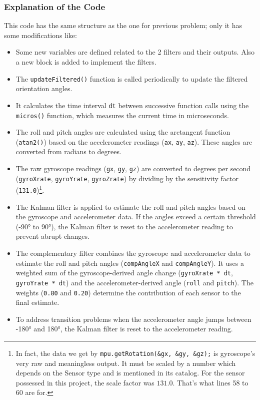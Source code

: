 \documentclass[conference]{IEEEtran}
\let\oldtexttt\texttt
\renewcommand{\texttt}[1]{\small\oldtexttt{#1}}
\begin{document}
\subsubsection*{Explanation of the Code}
This code has the same structure as the one for previous problem; only it has some modifications like:
\begin{itemize}
    \item Some new variables are defined related to the 2 filters and their outputs. Also a new block is added to implement the filters.
    \item The \texttt{updateFiltered()} function is called periodically to update the filtered orientation angles.
    \item It calculates the time interval \texttt{dt} between successive function calls using the \texttt{micros()} function, which measures the current time in microseconds.
    \item The roll and pitch angles are calculated using the arctangent function (\texttt{atan2()}) based on the accelerometer readings (\texttt{ax}, \texttt{ay}, \texttt{az}). These angles are converted from radians to degrees.
    \item The raw gyroscope readings (\texttt{gx}, \texttt{gy}, \texttt{gz}) are converted to degrees per second (\texttt{gyroXrate}, \texttt{gyroYrate}, \texttt{gyroZrate}) by dividing by the sensitivity factor (\texttt{131.0})\footnote{In fact, the data we get by \texttt{mpu.getRotation(\&gx, \&gy, \&gz);} is gyroscope's very raw and meaningless output. It must be scaled by a number which depends on the Sensor type and is mentioned in its catalog. For the sensor possessed in this project, the scale factor was $131.0$. That's what lines 58 to 60 are for.}.
    \item The Kalman filter is applied to estimate the roll and pitch angles based on the gyroscope and accelerometer data. If the angles exceed a certain threshold (-90° to 90°), the Kalman filter is reset to the accelerometer reading to prevent abrupt changes.
    \item The complementary filter combines the gyroscope and accelerometer data to estimate the roll and pitch angles (\texttt{compAngleX} and \texttt{compAngleY}). It uses a weighted sum of the gyroscope-derived angle change (\texttt{gyroXrate * dt}, \texttt{gyroYrate * dt}) and the accelerometer-derived angle (\texttt{roll} and \texttt{pitch}). The weights (\texttt{0.80} and \texttt{0.20}) determine the contribution of each sensor to the final estimate.
    \item To address transition problems when the accelerometer angle jumps between -180° and 180°, the Kalman filter is reset to the accelerometer reading.

\end{itemize}
\end{document}
